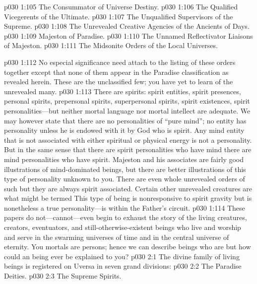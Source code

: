 \begin{ubquote}
\vs p030 1:105 The Consummator of Universe Destiny.
\vs p030 1:106 The Qualified Vicegerents of the Ultimate.
\vs p030 1:107 The Unqualified Supervisors of the Supreme.
\vs p030 1:108 The Unrevealed Creative Agencies of the Ancients of Days.
\vs p030 1:109 Majeston of Paradise.
\vs p030 1:110 The Unnamed Reflectivator Liaisons of Majeston.
\vs p030 1:111 The Midsonite Orders of the Local Universes.
\end{ubquote}
\pc \vs p030 1:112 No especial significance need attach to the listing of these orders together except that none of them appear in the Paradise classification as revealed herein. These are the unclassified few; you have yet to learn of the unrevealed many.
\vs p030 1:113 There are spirits: spirit entities, spirit presences, personal spirits, prepersonal spirits, superpersonal spirits, spirit existences, spirit personalities---but neither mortal language nor mortal intellect are adequate. We may however state that there are no personalities of “pure mind”; no entity has personality unless he is endowed with it by God who is spirit. Any mind entity that is not associated with either spiritual or physical energy is not a personality. But in the same sense that there are spirit personalities who have mind there are mind personalities who have spirit. Majeston and his associates are fairly good illustrations of mind\hyp{}dominated beings, but there are better illustrations of this type of personality unknown to you. There are even whole unrevealed orders of such  but they are always spirit associated. Certain other unrevealed creatures are what might be termed  This type of being is nonresponsive to spirit gravity but is nonetheless a true personality---is within the Father’s circuit.
\pc \vs p030 1:114 These papers do not---cannot---even begin to exhaust the story of the living creatures, creators, eventuators, and still\hyp{}otherwise\hyp{}existent beings who live and worship and serve in the swarming universes of time and in the central universe of eternity. You mortals are persons; hence we can describe beings who are  but how could an  being ever be explained to you?
\vs p030 2:1 The divine family of living beings is registered on Uversa in seven grand divisions:\plusone
\pc \vs p030 2:2 \bibnobreakspace The Paradise Deities.
\vs p030 2:3 \bibnobreakspace The Supreme Spirits.
